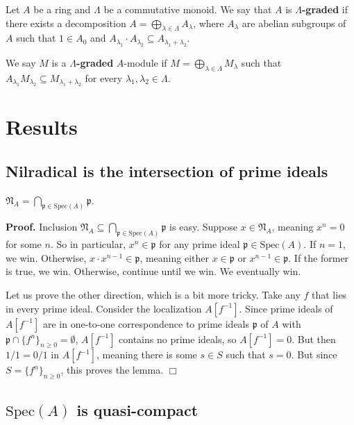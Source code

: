 \documentclass{template}
\newcommand{\qedwhite}{\hfill \ensuremath{\Box}}
\begin{document}
\begin{definition}
    Let $A$ be a ring and $\Lambda$ be a commutative monoid. We say that $A$ is
    \textbf{$\Lambda$-graded} if there exists a decomposition $A =
    \bigoplus_{\lambda \in \Lambda}A_{\lambda}$, where $A_{\lambda}$ are abelian
    subgroups of $A$ such that $1 \in A_0$ and $A_{\lambda_1} \cdot
    A_{\lambda_2} \subseteq A_{\lambda_1 + \lambda_2}$.

    We say $M$ is a \textbf{$\Lambda$-graded} $A$-module if $M =
    \bigoplus_{\lambda \in \Lambda}M_{\lambda}$ such that
    $A_{\lambda_1}M_{\lambda_2} \subseteq M_{\lambda_1+\lambda_2}$ for every
    $\lambda_1,\lambda_2 \in \Lambda$.
\end{definition}

\section{Results}

\subsection{Nilradical is the intersection of prime ideals}
\begin{lemma}
    $\mathfrak{N}_A = \bigcap_{\mathfrak{p} \in \text{Spec}(A)}\mathfrak{p}$.
\end{lemma}

\textbf{Proof.} Inclusion $\mathfrak{N}_A \subseteq \bigcap_{\mathfrak{p} \in
\text{Spec}(A)}\mathfrak{p}$ is easy. Suppose $x \in \mathfrak{N}_A$, meaning
$x^n = 0$ for some $n$. So in particular, $x^n \in \mathfrak{p}$ for any prime
ideal $\mathfrak{p} \in \text{Spec}(A)$. If $n=1$, we win. Otherwise, $x \cdot
x^{n-1} \in \mathfrak{p}$, meaning either $x \in \mathfrak{p}$ or $x^{n-1} \in
\mathfrak{p}$. If the former is true, we win. Otherwise, continue until we win.
We eventually win.

Let us prove the other direction, which is a bit more tricky. Take any $f$ that
lies in every prime ideal. Consider the localization $A[f^{-1}]$. Since prime
ideals of $A[f^{-1}]$ are in one-to-one correspondence to prime ideals
$\mathfrak{p}$ of $A$ with $\mathfrak{p} \cap \{f^n\}_{n \geq 0} = \emptyset$,
$A[f^{-1}]$ contains no prime ideals, so $A[f^{-1}]=0$. But then $1/1=0/1$ in
$A[f^{-1}]$, meaning there is some $s \in S$ such that $s=0$. But since
$S=\{f^n\}_{n \geq 0}$, this proves the lemma. \qedwhite

\subsection{$\text{Spec}(A)$ is quasi-compact}
\end{document}
